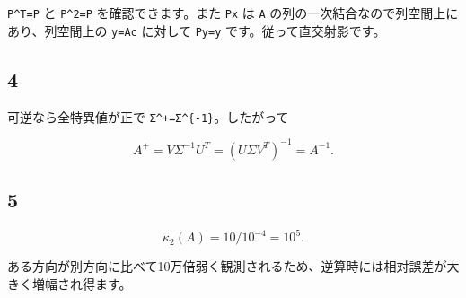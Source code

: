 \documentclass[
  11pt,
  a4paper,
]{ltjsarticle}
\begin{document}
\texttt{P\^{}T=P} と \texttt{P\^{}2=P} を確認できます。また \texttt{Px}
は \texttt{A} の列の一次結合なので列空間上にあり、列空間上の
\texttt{y=Ac} に対して \texttt{Py=y} です。従って直交射影です。

\hypertarget{section-3}{%
\subsection{4}\label{section-3}}

可逆なら全特異値が正で \texttt{Σ\^{}+=Σ\^{}\{-1\}}。したがって

\[
A^+=VΣ^{-1}U^T=(UΣV^T)^{-1}=A^{-1}.
\]

\hypertarget{section-4}{%
\subsection{5}\label{section-4}}

\[
\kappa_2(A)=10/10^{-4}=10^5.
\]

ある方向が別方向に比べて10万倍弱く観測されるため、逆算時には相対誤差が大きく増幅され得ます。
\end{document}
